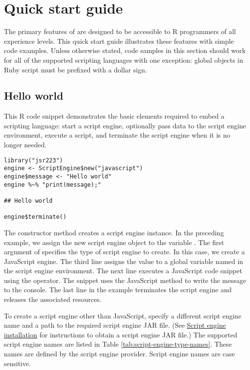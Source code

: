 \section{Quick start guide}

The primary features of  are designed to be accessible to R programmers of all experience levels. This quick start guide illustrates these features with simple code examples. Unless otherwise stated, code samples in this section should work for all of the supported scripting languages with one exception: global objects in Ruby script must be prefixed with a dollar sign.

\subsection{Hello world}

This R code snippet demonstrates the basic elements required to embed a scripting language: start a script engine, optionally pass data to the script engine environment, execute a script, and terminate the script engine when it is no longer needed.

\begin{verbatim}
library("jsr223")
engine <- ScriptEngine$new("javascript")
engine$message <- "Hello world"
engine %~% "print(message);"

## Hello world

engine$terminate()
\end{verbatim}

The  constructor method creates a script engine instance. In the preceding example, we assign the new script engine object to the variable . The first argument of  specifies the type of script engine to create. In this case, we create a JavaScript engine. The third line assigns the value  to a global variable named  in the script engine environment. The next line executes a JavaScript code snippet using the \code{\%$\sim$\%} operator. The snippet uses the JavaScript  method to write the message to the console. The last line in the example terminates the script engine and releases the associated resources.

To create a script engine other than JavaScript, specify a different script engine name and a path to the required script engine JAR file. (See \hyperlink{scriptengineinstallation}{Script engine installation} for instructions to obtain a script engine JAR file.) The supported script engine names are listed in Table \ref{tab:script-engine-type-names}. These names are defined by the script engine provider.  Script engine names are case sensitive.

